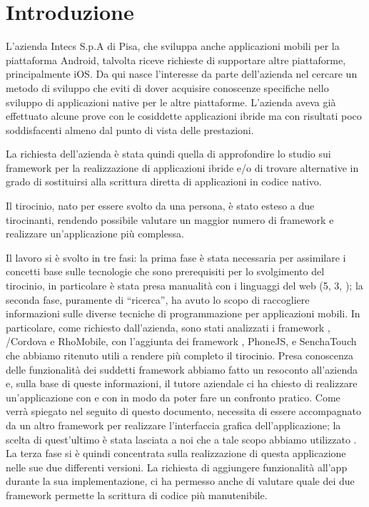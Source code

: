 \setcounter{page}{1}

\chapter{Introduzione}
    L'azienda Intecs S.p.A di Pisa, che sviluppa anche applicazioni mobili per la
    piattaforma Android, talvolta riceve richieste di supportare altre piattaforme,
    principalmente iOS. Da qui nasce l'interesse da parte dell'azienda nel
    cercare un metodo di sviluppo \crossplat{} che eviti di dover acquisire
    conoscenze specifiche nello sviluppo di applicazioni native per le altre
    piattaforme. L'azienda aveva già effettuato alcune prove con le cosiddette
    applicazioni ibride ma con risultati poco soddisfacenti almeno dal punto di
    vista delle prestazioni.

    La richiesta dell'azienda è stata quindi quella di approfondire lo studio sui
    frame\-work per la realizzazione di applicazioni ibride e/o di trovare alternative
    in grado di sostituirsi alla scrittura diretta di applicazioni in codice
    nativo.

    Il tirocinio, nato per essere svolto da una persona, è stato esteso a due
    tirocinanti, rendendo possibile valutare un maggior numero di frame\-work e
    realizzare un'applicazione più complessa.

    Il lavoro si è svolto in tre fasi: la prima fase è stata necessaria per
    assimilare i concetti base sulle tecnologie che sono prerequisiti per lo
    svolgimento del tirocinio, in particolare è stata presa manualità con i
    linguaggi del web (\html{}5, \css{}3, \js{}); la seconda fase, puramente di
    ``ricerca'', ha avuto lo scopo di raccogliere informazioni sulle diverse
    tecniche di programmazione per applicazioni mobili. In particolare,
    come richiesto dall'azienda, sono
    stati analizzati i frame\-work \tisdk{},
    \pg{}/Cordova e RhoMobile, con l'aggiunta dei frame\-work
    \jqm{}, PhoneJS, \kendomob{} e SenchaTouch che abbiamo ritenuto
    utili a rendere più completo il tirocinio.
    Presa conoscenza delle funzionalità dei suddetti frame\-work abbiamo fatto un
    resoconto all'azienda e, sulla base di queste informazioni, il tutore
    aziendale ci ha chiesto di realizzare un'applicazione con \pg{} e con
    \tisdk{} in modo da poter fare un confronto pratico. Come verrà spiegato
    nel seguito di questo documento, \pg{} necessita di essere accompagnato da
    un altro frame\-work per realizzare l'interfaccia grafica
    dell'applicazione; la scelta di quest'ultimo è stata lasciata a noi che
    a tale scopo abbiamo utilizzato \kendomob{}.
    La terza fase si è quindi concentrata sulla realizzazione di questa
    applicazione nelle sue due differenti versioni. La richiesta di aggiungere
    funzionalità all'app durante la sua implementazione, ci ha permesso anche di
    valutare quale dei due frame\-work permette la scrittura di codice più
    manutenibile.

